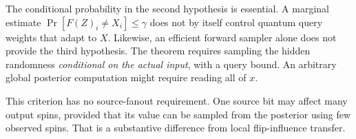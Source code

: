 The conditional probability in the second hypothesis is essential.
A marginal estimate \(\Pr[F(Z)_i\ne X_i]\le\gamma\) does not by
itself control quantum query weights that adapt to \(X\). Likewise,
an efficient forward sampler alone does not provide the third
hypothesis. The theorem requires sampling the hidden randomness
\emph{conditional on the actual input}, with a query bound. An
arbitrary global posterior computation might require reading all of
\(x\).

This criterion has no source-fanout requirement. One source bit may
affect many output spins, provided that its value can be sampled from
the posterior using few observed spins. That is a substantive
difference from local flip-influence transfer.
